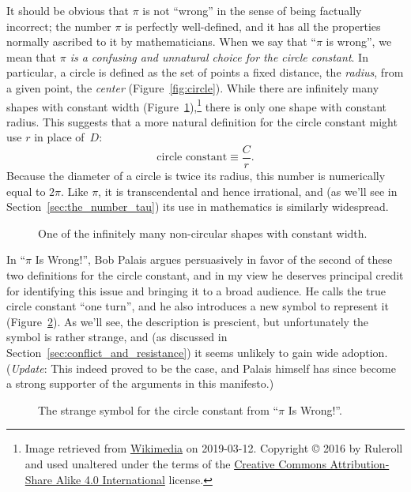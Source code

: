 It should be obvious that $\pi$ is not ``wrong'' in the sense of being factually incorrect; the number $\pi$ is perfectly well-defined, and it has all the properties normally ascribed to it by mathematicians. When we say that ``$\pi$ is wrong'', we mean that \emph{$\pi$ is a confusing and unnatural choice for the circle constant}. In particular, a circle is defined as the set of points a fixed distance, the \emph{radius}, from a given point, the \emph{center} (Figure~\ref{fig:circle}). While there are infinitely many shapes with constant width (Figure~\ref{fig:constant_width}),\footnote{Image retrieved from \href{https://commons.wikimedia.org/wiki/File:Reuleaux_triangle_roll.gif}{Wikimedia} on 2019-03-12. Copyright © 2016 by Ruleroll and used unaltered under the terms of the \href{https://creativecommons.org/licenses/by-sa/4.0/deed.en}{Creative Commons Attribution-Share Alike 4.0 International} license.} there is only one shape with constant radius. This suggests that a more natural definition for the circle constant might use $r$ in place of~$D$:
\begin{equation}
\label{eq:circle_constant}
\mbox{circle constant} \equiv \frac{C}{r}.
\end{equation}
Because the diameter of a circle is twice its radius, this number is numerically equal to $2\pi$. Like $\pi$, it is transcendental and hence irrational, and (as we'll see in Section~\ref{sec:the_number_tau}) its use in mathematics is similarly widespread.

\begin{figure}
\caption{One of the infinitely many non-circular shapes with constant width.\label{fig:constant_width}}
\end{figure}

In ``$\pi$ Is Wrong!'', Bob Palais argues persuasively in favor of the second of these two definitions for the circle constant, and in my view he deserves principal credit for identifying this issue and bringing it to a broad audience. He calls the true circle constant ``one turn'', and he also introduces a new symbol to represent it (Figure~\ref{fig:palais_tau}). As we'll see, the description is prescient, but unfortunately the symbol is rather strange, and (as discussed in Section~\ref{sec:conflict_and_resistance}) it seems unlikely to gain wide adoption. (\emph{Update}: This indeed proved to be the case, and Palais himself has since become a strong supporter of the arguments in this manifesto.)

\begin{figure}
\caption{The strange symbol for the circle constant from ``$\pi$ Is Wrong!''.\label{fig:palais_tau}}
\end{figure}

